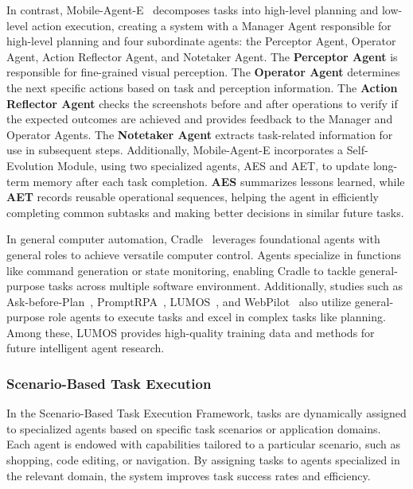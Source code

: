 In contrast, Mobile-Agent-E~\cite{wang2025mobile} decomposes tasks into high-level planning and low-level action execution, creating a system with a Manager Agent responsible for high-level planning and four subordinate agents: the Perceptor Agent, Operator Agent, Action Reflector Agent, and Notetaker Agent. The \textbf{Perceptor Agent} is responsible for fine-grained visual perception. The \textbf{Operator Agent} determines the next specific actions based on task and perception information. The \textbf{Action Reflector Agent} checks the screenshots before and after operations to verify if the expected outcomes are achieved and provides feedback to the Manager and Operator Agents. The \textbf{Notetaker Agent} extracts task-related information for use in subsequent steps. Additionally, Mobile-Agent-E incorporates a Self-Evolution Module, using two specialized agents, AES and AET, to update long-term memory after each task completion. \textbf{AES} summarizes lessons learned, while \textbf{AET} records reusable operational sequences, helping the agent in efficiently completing common subtasks and making better decisions in similar future tasks.



In general computer automation, Cradle~\cite{tan2024cradle} leverages foundational agents with general roles to achieve versatile computer control. Agents specialize in functions like command generation or state monitoring, enabling Cradle to tackle general-purpose tasks across multiple software environment.
Additionally, studies such as Ask-before-Plan~\cite{zhang2024ask}, PromptRPA~\cite{huang2024promptrpa}, LUMOS~\cite{yin2024agent}, and WebPilot~\cite{zhang2024webpilot} also utilize general-purpose role agents to execute tasks and excel in complex tasks like planning. Among these, LUMOS provides high-quality training data and methods for future intelligent agent research.


\subsubsection{Scenario-Based Task Execution}
\label{subsubsec: Scenario-Based Task Execution}

In the Scenario-Based Task Execution Framework, tasks are dynamically assigned to specialized agents based on specific task scenarios or application domains. Each agent is endowed with capabilities tailored to a particular scenario, such as shopping, code editing, or navigation. By assigning tasks to agents specialized in the relevant domain, the system improves task success rates and efficiency.

